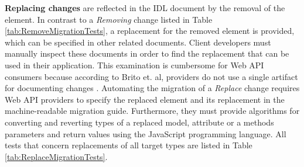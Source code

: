 \textbf{Replacing changes} are reflected in the IDL document by the removal of the element. In contrast to a \textit{Removing} change listed in Table \ref{tab:RemoveMigrationTests}, a replacement for the removed element is provided, which can be specified in other related documents. Client developers must manually inspect these documents in order to find the replacement that can be used in their application. This examination is cumbersome for Web API consumers because according to Brito et. al, providers do not use a single artifact for documenting changes \cite{brito_you_2020}. Automating the migration of a \textit{Replace} change requires Web API providers to specify the replaced element and its replacement in the machine-readable migration guide. Furthermore, they must provide algorithms for converting and reverting types of a replaced model, attribute or a methods parameters and return values using the JavaScript programming language. All tests that concern replacements of all target types are listed in Table \ref{tab:ReplaceMigrationTests}.

